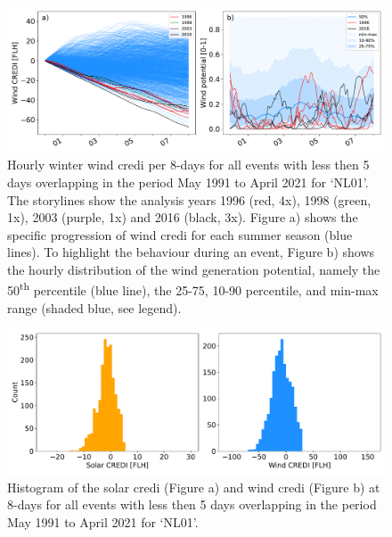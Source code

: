 \documentclass[12pt]{iopart}
\newcommand{\ts}[1]{\textsuperscript{#1}}
\newcommand{\sdi}[0]{{\sc solar credi}}
\newcommand{\wdi}[0]{{\sc wind credi}}
\begin{document}
\begin{figure}[h]
        \centering
        \includegraphics[width=\textwidth]{Figures_SI/WindCREDI_shortterm_behaviour}
        \caption{
                Hourly winter \wdi{} per 8-days for all events with less then 5 days overlapping in the period May 1991 to April 2021 for `NL01'. 
                The storylines show the analysis years 1996 (red, 4x), 1998 (green, 1x), 2003 (purple, 1x) and 2016 (black, 3x). 
                Figure a) shows the specific progression of \wdi{} for each summer season (blue lines). 
                To highlight the behaviour during an event, Figure b) shows the hourly distribution of the wind generation potential, namely the 50\ts{th} percentile (blue line), the 25-75, 10-90 percentile, and min-max range (shaded blue, see legend).
        }
        \label{SIfig:analysis_short-term-winter_wind_behaviour}
\end{figure}

\begin{figure}[h]
        \centering
        \includegraphics[width=\textwidth]{Figures_SI/CREDI_shortterm_histogram}
        \caption{
                Histogram of the \sdi{} (Figure a) and \wdi{} (Figure b) at 8-days for all events with less then 5 days overlapping in the period May 1991 to April 2021 for `NL01'. 
        }
        \label{SIfig:analysis_short-term-winter_wind_histogram}
\end{figure}
\end{document}
